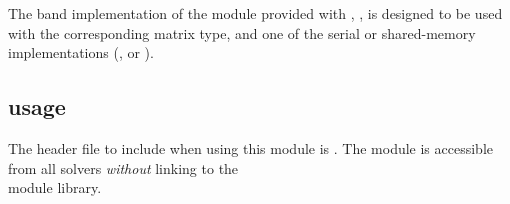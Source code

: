 
The band implementation of the {\sunlinsol} module provided with
{\sundials}, {\sunlinsolband}, is designed to be used with the
corresponding {\sunmatband} matrix type, and one of the serial or
shared-memory {\nvector} implementations ({\nvecs}, {\nvecopenmp} or
{\nvecpthreads}).


\subsection{{\sunlinsolband} usage}\label{ss:sunlinsol_band_usage}

The header file to include when using this module is
. The {\sunlinsolband} module 
is accessible from all {\sundials} solvers \textit{without}
linking to the \\ \noindent
{} module library.

